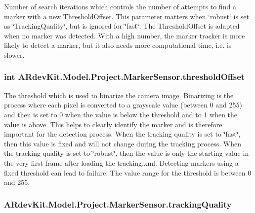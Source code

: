 Number of search iterations which controls the number of attempts to find a marker with a new Threshold\-Offset. This parameter matters when \char`\"{}robust\char`\"{} is set as \char`\"{}\-Tracking\-Quality\char`\"{}, but is ignored for \char`\"{}fast\char`\"{}. The Threshold\-Offset is adapted when no marker was detected. With a high number, the marker tracker is more likely to detect a marker, but it also needs more computational time, i.\-e. is slower. 

\hypertarget{class_a_rdev_kit_1_1_model_1_1_project_1_1_marker_sensor_ad80a6fc2821f265fc4c0583d0a66dfa7}{
\subsubsection[{threshold\-Offset}]{\setlength{\rightskip}{0pt plus 5cm}int A\-Rdev\-Kit.\-Model.\-Project.\-Marker\-Sensor.\-threshold\-Offset\hspace{0.3cm}{\ttfamily [protected]}}}\label{class_a_rdev_kit_1_1_model_1_1_project_1_1_marker_sensor_ad80a6fc2821f265fc4c0583d0a66dfa7}


The threshold which is used to binarize the camera image. Binarizing is the process where each pixel is converted to a grayscale value (between 0 and 255) and then is set to 0 when the value is below the threshold and to 1 when the value is above. This helps to clearly identify the marker and is therefore important for the detection process. When the tracking quality is set to \char`\"{}fast\char`\"{}, then this value is fixed and will not change during the tracking process. When the tracking quality is set to \char`\"{}robust\char`\"{}, then the value is only the starting value in the very first frame after loading the tracking.\-xml. Detecting markers using a fixed threshold can lead to failure. The value range for the threshold is between 0 and 255. 

\hypertarget{class_a_rdev_kit_1_1_model_1_1_project_1_1_marker_sensor_af392037ccf5a8cf5e95ce42b0c768483}{
\subsubsection[{tracking\-Quality}]{ A\-Rdev\-Kit.\-Model.\-Project.\-Marker\-Sensor.\-tracking\-Quality\hspace{0.3cm}{\ttfamily [protected]}}}\label{class_a_rdev_kit_1_1_model_1_1_project_1_1_marker_sensor_af392037ccf5a8cf5e95ce42b0c768483}


